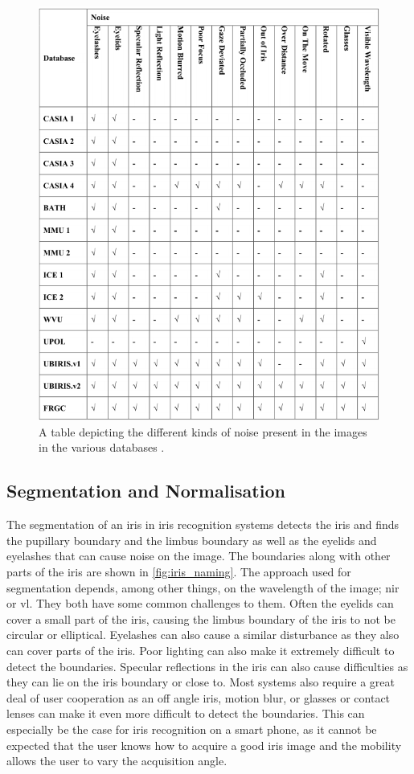\begin{figure}[H]
\centering
\includegraphics[width=\textwidth]{figures/Iris_Database_tabel_2.png} 
\caption{A table depicting the different kinds of noise present in the images in the various databases \citep{Rifaee2017}.}
\label{fig:Iris_database_2}
\end{figure}


\subsection{Segmentation and Normalisation}
The segmentation of an iris in iris recognition systems detects the iris and finds the pupillary boundary and the limbus boundary as well as the eyelids and eyelashes that can cause noise on the image. The boundaries along with other parts of the iris are shown in \autoref{fig:iris_naming}. The approach used for segmentation depends, among other things, on the wavelength of the image; \gls{nir} or \gls{vl}. They both have some common challenges to them. Often the eyelids can cover a small part of the iris, causing the limbus boundary of the iris to not be circular or elliptical. Eyelashes can also cause a similar disturbance as they also can cover parts of the iris. Poor lighting can also make it extremely difficult to detect the boundaries. Specular reflections in the iris can also cause difficulties as they can lie on the iris boundary or close to. Most systems also require a great deal of user cooperation as an off angle iris, motion blur, or glasses or contact lenses can make it even more difficult to detect the boundaries. This can especially be the case for iris recognition on a smart phone, as it cannot be expected that the user knows how to acquire a good iris image and the mobility allows the user to vary the acquisition angle. 

